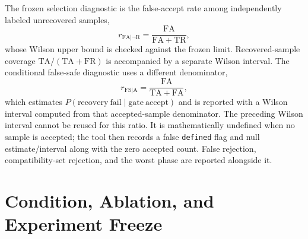 The frozen selection diagnostic is the false-accept rate among independently
labeled unrecovered samples,
\begin{equation}
  r_{\mathrm{FA}|\neg\mathrm{R}}
  =\frac{\mathrm{FA}}{\mathrm{FA}+\mathrm{TR}},
\end{equation}
whose Wilson upper bound is checked against the frozen limit.  Recovered-sample
coverage $\mathrm{TA}/(\mathrm{TA}+\mathrm{FR})$ is accompanied by a separate
Wilson interval.  The conditional false-safe diagnostic uses a different
denominator,
\begin{equation}
  r_{\mathrm{FS}|\mathrm{A}}
  =\frac{\mathrm{FA}}{\mathrm{TA}+\mathrm{FA}},
\end{equation}
which estimates $P(\mathrm{recovery\ fail}\mid\mathrm{gate\ accept})$ and is
reported with a Wilson interval computed from that accepted-sample denominator.
The preceding Wilson interval cannot be reused for this ratio.  It is
mathematically undefined when no sample is accepted; the tool then records a
false \texttt{defined} flag and null estimate/interval along with the zero
accepted count.  False rejection, compatibility-set
rejection, and the worst phase are reported alongside it.

\section{Condition, Ablation, and Experiment Freeze}


